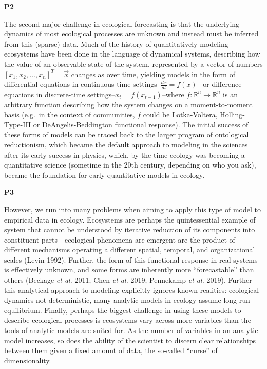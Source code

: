 \documentclass[10pt,oneside]{article}
\begin{document}
\textbf{P2}

The second major challenge in ecological forecasting is that the
underlying dynamics of most ecological processes are unknown and instead
must be inferred from this (sparse) data. Much of the history of
quantitatively modeling ecosystems have been done in the language of
dynamical systems, describing how the value of an observable state of
the system, represented by a vector of numbers
\([x_1, x_2, \dots, x_n]^T = \vec{x}\) changes as over time, yielding
models in the form of differential equations in continuous-time
settings--\(\frac{dx}{dt} = f(x)\)-- or difference equations in
discrete-time settings--\(x_t = f(x_{t-1})\)--where
\(f:\mathbb{R}^n \to \mathbb{R}^n\) is an arbitrary function describing
how the system changes on a moment-to-moment basis (e.g.~in the context
of communities, \(f\) could be Lotka-Voltera, Holling-Type-III or
DeAngelis-Beddington functional response). The initial success of these
forms of models can be traced back to the larger program of ontological
reductionism, which became the default approach to modeling in the
sciences after its early success in physics, which, by the time ecology
was becoming a quantitative science (sometime in the 20th century,
depending on who you ask), became the foundation for early quantitative
models in ecology.

\textbf{P3}

However, we run into many problems when aiming to apply this type of
model to empirical data in ecology. Ecosystems are perhaps the
quintessential example of system that cannot be understood by iterative
reduction of its components into constituent parts---ecological
phenomena are emergent are the product of different mechanisms operating
a different spatial, temporal, and organizational scales (Levin 1992).
Further, the form of this functional response in real systems is
effectively unknown, and some forms are inherently more ``forecastable''
than others (Beckage \emph{et al.} 2011; Chen \emph{et al.} 2019;
Pennekamp \emph{et al.} 2019). Further this analytical approach to
modeling explicitly ignores known realities: ecological dynamics not
deterministic, many analytic models in ecology assume long-run
equilibrium. Finally, perhaps the biggest challenge in using these
models to describe ecological processes is ecosystems vary across more
variables than the tools of analytic models are suited for. As the
number of variables in an analytic model increases, so does the ability
of the scientist to discern clear relationships between them given a
fixed amount of data, the so-called ``curse'' of dimensionality.
\end{document}
